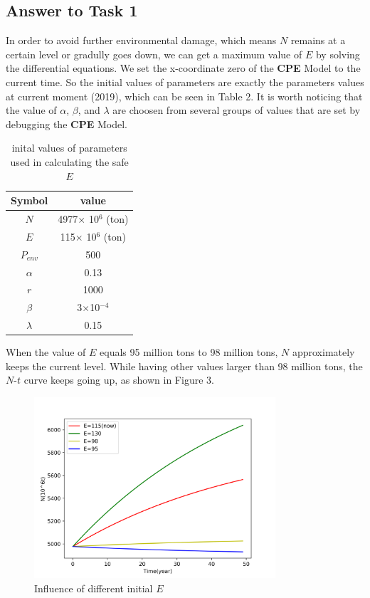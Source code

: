 \documentclass{mcmthesis}
\begin{document}
 \subsection{Answer to Task 1}
	 In order to avoid further environmental damage, which means $N$ remains at a certain level or gradully goes down, we can get a maximum value of $E$ by solving the differential equations. We set the x-coordinate zero of the \textbf{CPE} Model to the current time. So the initial values of parameters are exactly the parameters values at current moment (2019), which can be seen in Table 2. It is worth noticing that the value of $\alpha$, $\beta$, and $\lambda$ are choosen from several groups of values that are set by debugging the \textbf{CPE} Model. %
	 \begin{table}[H]
	  \renewcommand\arraystretch{1.2}
	  \centering
	 \caption{inital values of parameters used in calculating the safe $E$}
	 \begin{tabular}{|c|c|}%
        \hline
        Symbol&value\\
        \hline
		$N$&4977$\times$ 10$^6$ (ton)\\
		\hline
        $E$&115$\times$ 10$^6$ (ton)\\
		\hline
		$P_{env}$&500\\
		\hline
		$\alpha$&0.13\\
		\hline
		$r$&1000\\
		\hline
		$\beta$&3$\times$10$^{-4}$\\
		\hline
		$\lambda$&0.15\\
        \hline
        \end{tabular}
    \end{table}
	  
	 When the value of $E$ equals 95 million tons to 98 million tons, $N$ approximately keeps the current level. While having other values larger than 98 million tons, the $N$-$t$ curve keeps going up, as shown in Figure 3.
	 
      \begin{figure}[H]
		\centering
		\includegraphics[width=0.8\textwidth]{figure/Estimation_of_minimal_achievable_level_plastic.png}
		 \caption{Influence of different initial $E$}
	   \end{figure}
\end{document}
